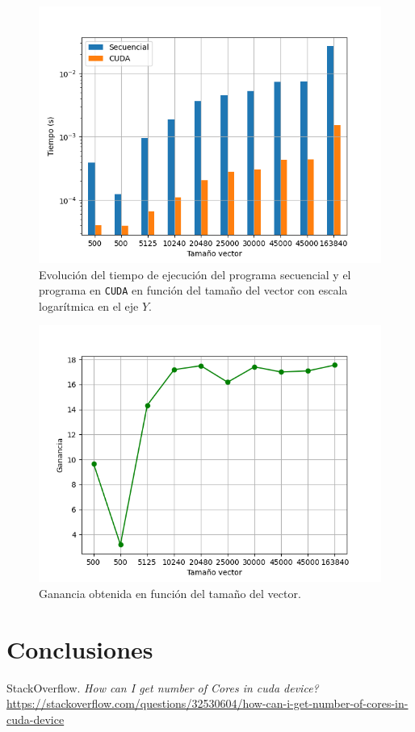 \documentclass[11pt,a4paper]{article}
\begin{document}
\begin{figure}[H]
  \centering
  \includegraphics[scale=0.6]{img/seq-cuda}
  \caption{Evolución del tiempo de ejecución del programa secuencial y el programa en
  \texttt{CUDA} en función del tamaño del vector con escala logarítmica en el eje $Y$.}
  \label{fig:seq-cuda}
\end{figure}

\begin{figure}[H]
  \centering
  \includegraphics[scale=0.6]{img/speedup}
  \caption{Ganancia obtenida en función del tamaño del vector.}
\end{figure}

\section{Conclusiones}

\newpage

\begin{thebibliography}{5}

StackOverflow. \textit{How can I get number of Cores in cuda device?}
\\\url{https://stackoverflow.com/questions/32530604/how-can-i-get-number-of-cores-in-cuda-device}

\end{thebibliography}
\end{document}
